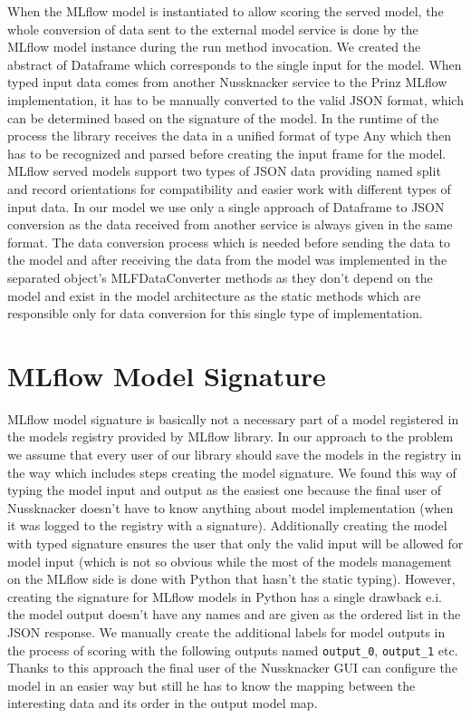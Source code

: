 When the MLflow model is instantiated to allow scoring the served model, the whole conversion of data
sent to the external model service is done by the MLflow model instance during the run method invocation.
We created the abstract of Dataframe which corresponds to the single input for the model. When typed input
data comes from another Nussknacker service to the Prinz MLflow implementation, it has to be manually
converted to the valid JSON format, which can be determined based on the signature of the model. In the
runtime of the process the library receives the data in a unified format of type Any which then has to
be recognized and parsed before creating the input frame for the model. MLflow served models support two
types of JSON data providing named split and record orientations for compatibility and easier work with
different types of input data. In our model we use only a single approach of Dataframe to JSON conversion
as the data received from another service is always given in the same format. The data conversion process
which is needed before sending the data to the model and after receiving the data from the model was
implemented in the separated object’s MLFDataConverter methods as they don’t depend on the model and
exist in the model architecture as the static methods which are responsible only for data conversion
for this single type of implementation.

\section{MLflow Model Signature}

MLflow model signature is basically not a necessary part of a model registered in the models registry
provided by MLflow library. In our approach to the problem we assume that every user of our library
should save the models in the registry in the way which includes steps creating the model signature.
We found this way of typing the model input and output as the easiest one because the final user of
Nussknacker doesn’t have to know anything about model implementation (when it was logged to the registry
with a signature). Additionally creating the model with typed signature ensures the user that only the
valid input will be allowed for model input (which is not so obvious while the most of the models management
on the MLflow side is done with Python that hasn’t the static typing). However, creating the signature
for MLflow models in Python has a single drawback e.i. the model output doesn’t have any names and are
given as the ordered list in the JSON response. We manually create the additional labels for model outputs
in the process of scoring with the following outputs named \texttt{output\_0}, \texttt{output\_1} etc. Thanks to this
approach the final user of the Nussknacker GUI can configure the model in an easier way but still he has
to know the mapping between the interesting data and its order in the output model map.

